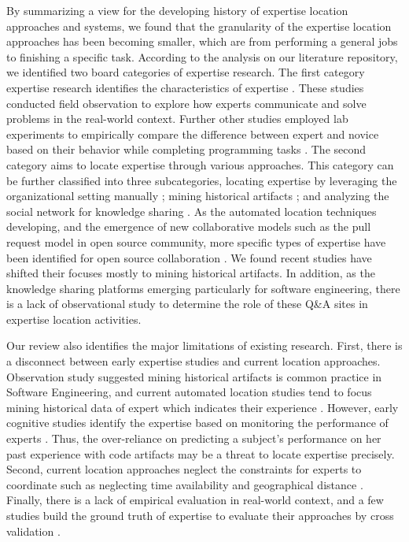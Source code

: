 By summarizing a view for the developing history of expertise location approaches and systems, we found that the granularity of the expertise location approaches has been becoming smaller, which are from performing a general jobs to finishing a specific task. According to the analysis on our literature repository, we identified two board categories of expertise research. The first category expertise research identifies the characteristics of expertise \cite{ericsson2006cambridge, MCKEITHEN1981307, soloway1984empirical}. These studies conducted field observation \cite{mcdonald1998just} to explore how experts communicate and solve problems in the real-world context. Further other studies employed lab experiments to empirically compare the difference between expert and novice based on their behavior while completing programming tasks \cite{MCKEITHEN1981307}. The second category aims to locate expertise through various approaches. This category can be further classified into three subcategories, locating expertise by leveraging the organizational setting manually \cite{yarosh2013need}; mining historical artifacts \cite{Anvik2006who, mockus2002expertise, schuler2008mining, servant2012whosefault, fritz2010degree}; and analyzing the social network for knowledge sharing \cite{nardi2002integrating, lin2009smallblue}. As the automated location techniques developing, and the emergence of new collaborative models such as the pull request model in open source community, more specific types of expertise have been identified for open source collaboration \cite{costa2016tipmerge, yu2016reviewer, chan2016improving}. We found recent studies have shifted their focuses mostly to mining historical artifacts. In addition, as the knowledge sharing platforms emerging particularly for software engineering, there is a lack of observational study to determine the role of these Q\&A sites in expertise location activities.


Our review also identifies the major limitations of existing research. First, there is a disconnect between early expertise studies and current location approaches. Observation study suggested mining historical artifacts is common practice in Software Engineering, and current automated location studies tend to focus mining historical data of expert which indicates their experience \cite{servant2012whosefault,costa2016tipmerge, yu2016reviewer}. However, early cognitive studies identify the expertise based on monitoring the performance of experts \cite{MCKEITHEN1981307, soloway1984empirical, pinto1988providing}. Thus, the over-reliance on predicting a subject's performance on her past experience with code artifacts may be a threat to locate expertise precisely. Second, current location approaches neglect the constraints for experts to coordinate such as neglecting time availability and geographical distance \cite{olson2000distance}. Finally, there is a lack of empirical evaluation in real-world context, and a few studies build the ground truth of expertise to evaluate their approaches by cross validation \cite{Anvik2006who, xu2016predicting}.

